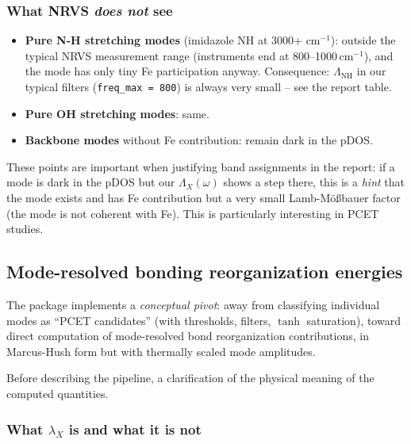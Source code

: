 \documentclass[11pt,a4paper,twoside]{article}
\theoremstyle{remark}
\begin{document}
\subsubsection*{What NRVS \emph{does not} see}

\begin{itemize}\setlength{\itemsep}{0pt}
  \item \textbf{Pure N-H stretching modes} (imidazole NH at 3000+
        cm$^{-1}$): outside the typical NRVS measurement range
        (instruments end at 800--1000\,cm$^{-1}$), and the mode
        has only tiny Fe participation anyway. Consequence:
        $\Lambda_\text{NH}$ in our typical filters
        (\texttt{freq\_max = 800}) is always very small -- see the
        report table.
  \item \textbf{Pure OH stretching modes}: same.
  \item \textbf{Backbone modes} without Fe contribution: remain
        dark in the pDOS.
\end{itemize}

These points are important when justifying band assignments in the
report: if a mode is dark in the pDOS but our $\Lambda_X(\omega)$
shows a step there, this is a \emph{hint} that the mode exists and
has Fe contribution but a very small Lamb-M\"o{\ss}bauer factor
(the mode is not coherent with Fe). This is particularly
interesting in PCET studies.


\subsection{Mode-resolved bonding reorganization energies}
\label{sec:reorg}

The package implements a \emph{conceptual pivot}: away from
classifying individual modes as ``PCET candidates'' (with
thresholds, filters, $\tanh$ saturation), toward direct
computation of mode-resolved bond reorganization contributions, in
Marcus-Hush form but with thermally scaled mode amplitudes.

Before describing the pipeline, a clarification of the physical
meaning of the computed quantities.

\subsubsection*{What $\lambda_X$ is and what it is not}
\end{document}
